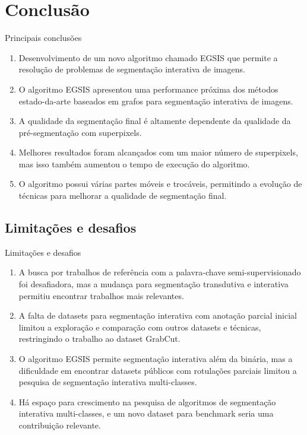 \documentclass{templatebeamerufc/libs/ufc_format}
\begin{document}
\section{Conclusão}
\begin{frame}{Principais conclusões}
  \begin{enumerate}[<+->]

  \item Desenvolvimento de um novo algoritmo chamado EGSIS que permite
    a resolução de problemas de segmentação interativa de imagens.

  \item O algoritmo EGSIS apresentou uma performance próxima dos métodos
    estado-da-arte baseados em grafos para segmentação interativa de
    imagens.

  \item A qualidade da segmentação final é altamente dependente da
    qualidade da pré-segmentação com superpixels.

  \item Melhores resultados foram alcançados com um maior número de
    superpixels, mas isso também aumentou o tempo de execução do
    algoritmo.

  \item O algoritmo possui várias partes móveis e trocáveis, permitindo a
    evolução de técnicas para melhorar a qualidade de segmentação final.

  \end{enumerate}
\end{frame}

\subsection{Limitações e desafios}


\begin{frame}{Limitações e desafios}
  \begin{enumerate}[<+->]
  \item A busca por trabalhos de referência com a palavra-chave
    semi-supervisionado foi desafiadora, mas a mudança para
    segmentação transdutiva e interativa permitiu encontrar trabalhos
    mais relevantes.

  \item A falta de datasets para segmentação interativa com anotação
    parcial inicial limitou a exploração e comparação com outros
    datasets e técnicas, restringindo o trabalho ao dataset GrabCut.

  \item O algoritmo EGSIS permite segmentação interativa além da
    binária, mas a dificuldade em encontrar datasets públicos com rotulações
    parciais limitou a pesquisa de segmentação interativa multi-classes.

  \item Há espaço para crescimento na pesquisa de algoritmos de
    segmentação interativa multi-classes, e um novo dataset para
    benchmark seria uma contribuição relevante.

  \end{enumerate}
\end{frame}
\end{document}
